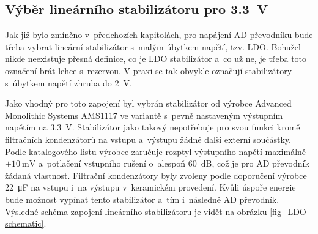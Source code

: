 


\subsection{Výběr lineárního stabilizátoru pro \SI{3.3}{\volt}}

Jak již bylo zmíněno v~předchozích kapitolách, pro napájení AD převodníku bude třeba vybrat lineární stabilizátor s~malým úbytkem napětí, tzv. LDO. Bohužel nikde neexistuje přesná definice, co je LDO stabilizátor a~co už ne, je třeba toto označení brát lehce s~rezervou. V praxi se tak obvykle označují stabilizátory s~úbytkem napětí zhruba do \SI{2}{\volt}.

Jako vhodný pro toto zapojení byl vybrán stabilizátor od výrobce Advanced Monolithic Systems AMS1117 \cite{dat_AMS1117} ve variantě s~pevně nastaveným výstupním napětím na \SI{3,3}{\volt}. Stabilizátor jako takový nepotřebuje pro svou funkci kromě filtračních kondenzátorů na vstupu a~výstupu žádné další externí součástky. Podle katalogového listu výrobce zaručuje rozptyl výstupního napětí maximálně $\pm\SI{10}{\milli\volt}$ a~potlačení vstupního rušení o~alespoň \SI{60}{\deci\bel}, což je pro AD převodník žádaná vlastnost. Filtrační kondenzátory byly zvoleny podle doporučení výrobce \SI{22}{\micro\farad} na vstupu i~na výstupu v~keramickém provedení. Kvůli úspoře energie bude možnost vypínat tento stabilizátor a~tím i~následně AD převodník. Výsledné schéma zapojení lineárního stabilizátoru je vidět na obrázku \ref{fig_LDO-schematic}.


